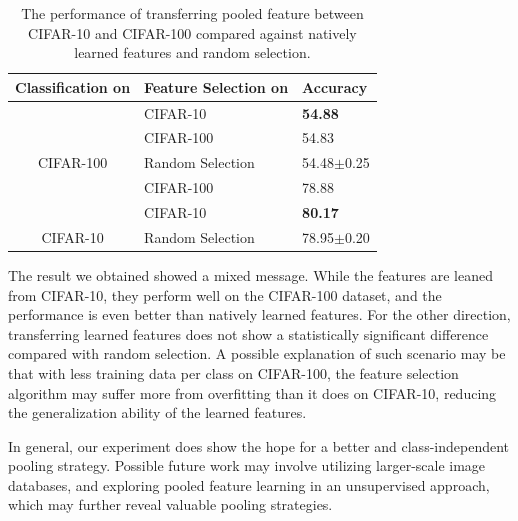 \begin{table}
  \centering
  \begin{tabular}{c|l|l}
    \hline
    Classification on & Feature Selection on & Accuracy \\
    \hline
          & CIFAR-10     & {\bfseries 54.88} \\ %
          & CIFAR-100      & 54.83\\ %
    CIFAR-100 %
          & Random Selection & 54.48$\pm$0.25\\
    \hline
             & CIFAR-100    & 78.88 \\ %
             & CIFAR-10     & {\bfseries 80.17}\\ %
    CIFAR-10 %
             & Random Selection & 78.95$\pm$0.20\\

    \hline
  \end{tabular}
  \caption{The performance of transferring pooled feature between CIFAR-10 and CIFAR-100 compared against natively learned features and random selection.}\label{table:transfer}
\end{table}

The result we obtained showed a mixed message. While the features are leaned from CIFAR-10, they perform well on the CIFAR-100 dataset, and the performance is even better than natively learned features. For the other direction, transferring learned features does not show a statistically significant difference compared with random selection. A possible explanation of such scenario may be that with less training data per class on CIFAR-100, the feature selection algorithm may suffer more from overfitting than it does on CIFAR-10, reducing the generalization ability of the learned features.

In general, our experiment does show the hope for a better and class-independent pooling strategy. Possible future work may involve utilizing larger-scale image databases, and exploring pooled feature learning in an unsupervised approach, which may further reveal valuable pooling strategies.

